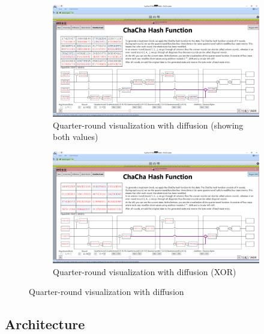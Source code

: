 \begin{figure}
\begin{subfigure}[t]{\textwidth}
  \centering
  \includegraphics[width=\textwidth]{figures/ct2/chachahash/chachahash-mid-qr-diffusion.png}
  \caption{Quarter-round visualization with diffusion (showing both values)}
  \label{fig:chachahash.mid.qr.diffusion.both}
\end{subfigure}
\begin{subfigure}[t]{\textwidth}
  \centering
  \includegraphics[width=\textwidth]{figures/ct2/chachahash/chachahash-mid-qr-diffusion-xor.png}
  \caption{Quarter-round visualization with diffusion (XOR)}
  \label{fig:chachahash.mid.qr.diffusion.xor}
\end{subfigure}
\caption{Quarter-round visualization with diffusion}
\label{fig:chachahash.mid.qr.diffusion}
\end{figure}



\FloatBarrier
\subsection{Architecture}
\label{sec:Architecture}

